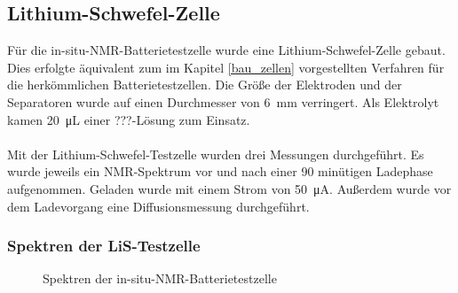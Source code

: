 \documentclass[a4paper, 11pt, headsepline,footsepline,twoside,abstract]{scrbook}
\begin{document}
\subsection{Lithium-Schwefel-Zelle}
Für die in-situ-NMR-Batterietestzelle wurde eine Lithium-Schwefel-Zelle gebaut. Dies erfolgte äquivalent zum im Kapitel \ref{bau_zellen} vorgestellten Verfahren für die herkömmlichen Batterietestzellen. Die Größe der Elektroden und der Separatoren wurde auf einen Durchmesser von \SI{6}{\milli\meter} verringert. Als Elektrolyt kamen \SI{20}{\micro\liter} einer ???-Lösung zum Einsatz.
\\\\
Mit der Lithium-Schwefel-Testzelle wurden drei Messungen durchgeführt. Es wurde jeweils ein NMR-Spektrum vor und nach einer 90 minütigen Ladephase aufgenommen. Geladen wurde mit einem Strom von \SI{50}{\micro\ampere}. Außerdem wurde vor dem Ladevorgang eine Diffusionsmessung durchgeführt.
\subsubsection{Spektren der LiS-Testzelle}
\begin{figure}
   \centering
       \vspace{10mm}
       \vspace{6mm}
	\caption{Spektren der in-situ-NMR-Batterietestzelle}
   	\label{insitu_nmr}
\end{figure}    
\end{document}
